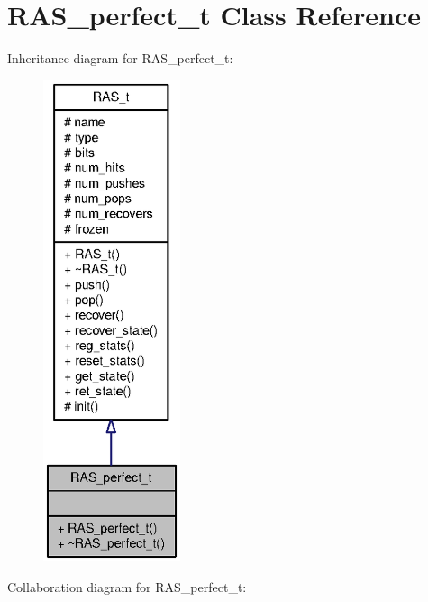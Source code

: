 \section{RAS\_\-perfect\_\-t Class Reference}
\label{classRAS__perfect__t}
Inheritance diagram for RAS\_\-perfect\_\-t:\nopagebreak
\begin{figure}[H]
\begin{center}
\leavevmode
\includegraphics[height=400pt]{classRAS__perfect__t__inherit__graph}
\end{center}
\end{figure}
Collaboration diagram for RAS\_\-perfect\_\-t:\nopagebreak

